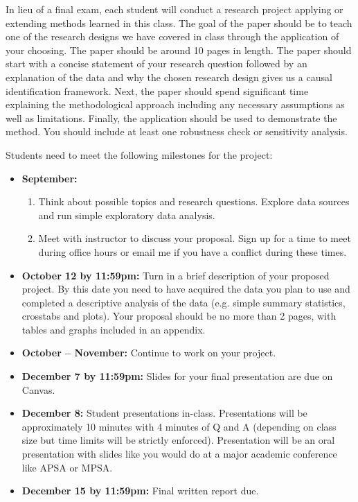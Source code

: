 \documentclass[11pt,letterpaper]{article}
\begin{document}
In lieu of a final exam, each student will conduct a research project applying or extending methods learned in this class. The goal of the paper should be to teach one of the research designs we have covered in class through the application of your choosing. The paper should be around 10 pages in length. The paper should start with a concise statement of your research question followed by an explanation of the data and why the chosen research design gives us a causal identification framework. Next, the paper should spend significant time explaining the methodological approach including any necessary assumptions as well as limitations. Finally, the application should be used to demonstrate the method. You should include at least one robustness check or sensitivity analysis.

Students need to meet the following milestones for the project:

\begin{itemize}[leftmargin=*]
  \item \textbf{September:}
  \begin{enumerate}
    \item Think about possible topics and research questions. Explore data sources and run simple exploratory data analysis.
    \item Meet with instructor to discuss your proposal. Sign up for a time to meet during office hours or email me if you have a conflict during these times.
  \end{enumerate}
  \item \textbf{October 12 by 11:59pm:} Turn in a brief description of your proposed project. By this date you need to have acquired the data you plan to use and completed a descriptive analysis of the data (e.g. simple summary statistics, crosstabs and plots). Your proposal should be no more than 2 pages, with tables and graphs included in an appendix.
  \item \textbf{October -- November:} Continue to work on your project.
  \item \textbf{December 7 by 11:59pm:} Slides for your final presentation are due on Canvas.
  \item \textbf{December 8:} Student presentations in-class. Presentations will be approximately 10 minutes with 4 minutes of Q and A (depending on class size but time limits will be strictly enforced). Presentation will be an oral presentation with slides like you would do at a major academic conference like APSA or MPSA.
  \item \textbf{December 15 by 11:59pm:} Final written report due.
\end{itemize}
\end{document}
